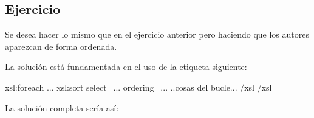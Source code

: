 \documentclass[letterpaper,10pt,spanish]{sphinxmanual}
\begin{document}
\subsection{Ejercicio}
\label{\detokenize{tema7:id4}}
Se desea hacer lo mismo que en el ejercicio anterior pero haciendo que los autores aparezcan de forma ordenada.

La solución está fundamentada en el uso de la etiqueta siguiente:

\begin{sphinxVerbatim}[commandchars=\\\{\}]
\PYGZlt{}xsl:for\PYGZhy{}each ...\PYGZgt{}
        \PYGZlt{}xsl:sort select=\PYGZdq{}...\PYGZdq{} ordering=\PYGZdq{}...\PYGZdq{}\PYGZgt{}
                ..cosas del bucle...
        \PYGZlt{}/xsl\PYGZgt{}
\PYGZlt{}/xsl\PYGZgt{}
\end{sphinxVerbatim}

La solución completa sería así:
\end{document}

